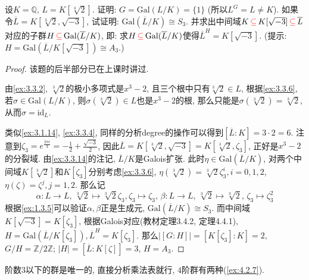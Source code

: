 \begin{problem}
    设$K = \mathbb{Q},\, L = K[\sqrt[3]{2}]$. 证明: $G = \mathrm{Gal}(L/K)=\{1\}$ (所以$L^G = L \neq K$). 如果令$\overline{L} = K[\sqrt[3]{2}, \sqrt{-3}]$, 试证明: $\mathrm{Gal}(\overline{L}/K) \cong S_3$. 并求出中间域$K \,\textcolor{red}{\subseteq}\, K[\sqrt{-3}] \,\textcolor{red}{\subseteq}\, \overline{L}$对应的子群$H \,\textcolor{red}{\subseteq}\, \mathrm{Gal}(\overline L/K)$, 即: 求$H \,\textcolor{red}{\subseteq}\, \mathrm{Gal}(\overline L/K)$使得$\overline{L}^{H} = K[\sqrt{-3}]$. (提示: $H = \mathrm{Gal}(\overline L/K[\sqrt{-3}]) \cong A_3$.)
\end{problem}

\begin{proof}
    该题的后半部分已在上课时讲过.

    由\ref{ex:3.3.2}, $\sqrt[3]{2}$的极小多项式是$x^3 - 2$, 且三个根中只有$\sqrt[3]{2} \in L$, 根据\ref{ex:3.3.6}, 若$\sigma \in \mathrm{Gal}(L/K)$, 则$\sigma(\sqrt[3]{2}) \in L$也是$x^3 - 2$的根, 那么只能是$\sigma(\sqrt[3]{2}) = \sqrt[3]{2}$, 从而$\sigma = \mathrm{id}_L$.

    类似\ref{ex:3.1.14}, \ref{ex:3.3.4}, 同样的分析degree的操作可以得到$[\overline{L}:K] = 3 \cdot 2 = 6$. 注意到$\zeta_3 = e^{\frac{2\pi i}{3}} = -\frac{1}{2} + \frac{\sqrt{-3}}{2}$, 因此$\overline{L} = K[\sqrt[3]{2}, \sqrt{-3}] = K[\sqrt[3]{2}, \zeta_3]$, 正好是$x^3 - 2$的分裂域. 由\ref{ex:3.3.14}的注记, $\overline{L}/K$是Galois扩张. 此时$\eta \in \mathrm{Gal}(\overline{L}/K)$, 对两个中间域$K[\sqrt[3]{2}]$和$K[\zeta_3]$分别考虑\ref{ex:3.3.6}, $\eta(\sqrt[3]{2}) = \sqrt[3]{2}\zeta_3^i, i = 0, 1, 2$, $\eta(\zeta) = \zeta^j, j = 1, 2$. 那么记
    \[
        \alpha:L \to L,\, \sqrt[3]{2} \mapsto \sqrt[3]{2}\zeta_3, \zeta_3 \mapsto \zeta_3,\, \beta:L \to L,\, \sqrt[3]{2} \mapsto \sqrt[3]{2},\, \zeta_3 \mapsto \zeta_3^2
    \]
    根据\ref{ex:1.3.5}可以验证$\alpha, \beta$正是生成元, $\mathrm{Gal}(\overline{L}/K) \cong S_3$. 而中间域$K[\sqrt{-3}] = K[\zeta_3]$, 根据Galois对应(教材定理3.4.2, 定理4.4.1), $H = \mathrm{Gal}(\overline{L}/K[\zeta_3]), \overline{L}^H = K[\zeta_3]$. 那么$|[G:H]| = [K[\zeta_3]:K] = 2$, $G/H = \mathbb{Z}/2\mathbb{Z}$; $|H| = [\overline{L}:K[\zeta]] = 3$, $H = A_3$. 
\end{proof}

\begin{remark}
    阶数$3$以下的群是唯一的, 直接分析乘法表就行, $4$阶群有两种(\ref{ex:4.2.7}).
\end{remark}

